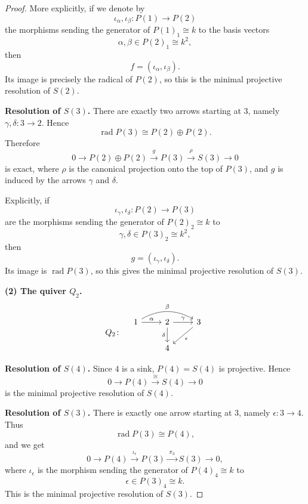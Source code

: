 \documentclass[11pt, a4paper]{article}
\begin{document}
\begin{enumerate}[leftmargin=*, label=\textbf{\arabic*.}]
\begin{proof}
    More explicitly, if we denote by
    \[
    \iota_\alpha,\iota_\beta : P(1)\to P(2)
    \]
    the morphisms sending the generator of $P(1)_1\cong k$ to the basis vectors
    \[
    \alpha,\beta \in P(2)_1\cong k^2,
    \]
    then
    \[
    f=(\iota_\alpha,\iota_\beta).
    \]
    Its image is precisely the radical of $P(2)$, so this is the minimal projective resolution of $S(2)$.
    
    \medskip
    \noindent\textbf{Resolution of $S(3)$.}
    There are exactly two arrows starting at $3$, namely $\gamma,\delta:3\to 2$. Hence
    \[
    \operatorname{rad} P(3)\cong P(2)\oplus P(2).
    \]
    Therefore
    \[
    0 \longrightarrow P(2)\oplus P(2)
    \xrightarrow{\;g\;}
    P(3)
    \xrightarrow{\;\rho\;}
    S(3)
    \longrightarrow 0
    \]
    is exact, where $\rho$ is the canonical projection onto the top of $P(3)$, and $g$ is induced by the arrows $\gamma$ and $\delta$.
    
    Explicitly, if
    \[
    \iota_\gamma,\iota_\delta : P(2)\to P(3)
    \]
    are the morphisms sending the generator of $P(2)_2\cong k$ to
    \[
    \gamma,\delta \in P(3)_2\cong k^2,
    \]
    then
    \[
    g=(\iota_\gamma,\iota_\delta).
    \]
    Its image is $\operatorname{rad} P(3)$, so this gives the minimal projective resolution of $S(3)$.
    
    \bigskip
    \noindent\textbf{(2) The quiver $Q_2$.}
    \[
    Q_2\colon\quad
    \begin{tikzcd}
    1 \arrow[r, "\alpha"] \arrow[rr, bend left, "\beta"]
    & 2 \arrow[r, "\gamma"] \arrow[d, "\delta"']
    & 3 \arrow[ld, "\epsilon"] \\
    & 4 &
    \end{tikzcd}
    \]
    
    \medskip
    \noindent\textbf{Resolution of $S(4)$.}
    Since $4$ is a sink, $P(4)=S(4)$ is projective. Hence
    \[
    0 \longrightarrow P(4) \xrightarrow{\;\cong\;} S(4) \longrightarrow 0
    \]
    is the minimal projective resolution of $S(4)$.
    
    \medskip
    \noindent\textbf{Resolution of $S(3)$.}
    There is exactly one arrow starting at $3$, namely $\epsilon:3\to 4$. Thus
    \[
    \operatorname{rad} P(3)\cong P(4),
    \]
    and we get
    \[
    0 \longrightarrow P(4)
    \xrightarrow{\;\iota_\epsilon\;}
    P(3)
    \xrightarrow{\;\pi_3\;}
    S(3)
    \longrightarrow 0,
    \]
    where $\iota_\epsilon$ is the morphism sending the generator of $P(4)_4\cong k$ to
    \[
    \epsilon \in P(3)_4\cong k.
    \]
    This is the minimal projective resolution of $S(3)$.
    

\end{proof}
\end{enumerate}
\end{document}
